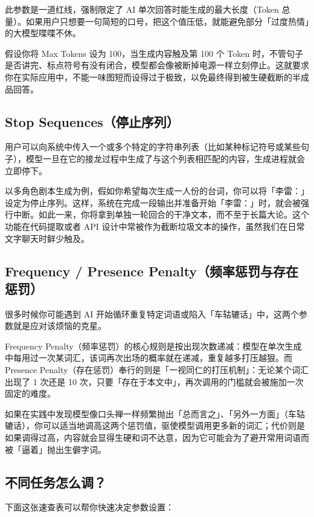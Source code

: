 此参数是一道红线，强制限定了 AI 单次回答时能生成的最大长度（Token 总量）。如果用户只想要一句简短的口号，把这个值压低，就能避免部分「过度热情」的大模型喋喋不休。

假设你将 Max Tokens 设为 100，当生成内容触及第 100 个 Token 时，不管句子是否讲完、标点符号有没有闭合，模型都会像被断掉电源一样立刻停止。这就要求你在实际应用中，不能一味图短而设得过于极致，以免最终得到被生硬截断的半成品回答。

\subsection*{Stop Sequences（停止序列）}

用户可以向系统中传入一个或多个特定的字符串列表（比如某种标记符号或某些句子），模型一旦在它的接龙过程中生成了与这个列表相匹配的内容，生成进程就会立即停下。

以多角色剧本生成为例，假如你希望每次生成一人份的台词，你可以将「李雷：」设定为停止序列。这样，系统在完成一段输出并准备开始「李雷：」时，就会被强行中断。如此一来，你将拿到单独一轮回合的干净文本，而不至于长篇大论。这个功能在代码提取或者 API 设计中常被作为截断垃圾文本的操作，虽然我们在日常文字聊天时鲜少触及。

\subsection*{Frequency / Presence Penalty（频率惩罚与存在惩罚）}

很多时候你可能遇到 AI 开始循环重复特定词语或陷入「车轱辘话」中，这两个参数就是应对该烦恼的克星。

Frequency Penalty（频率惩罚）的核心规则是按出现次数递减：模型在单次生成中每用过一次某词汇，该词再次出场的概率就在递减，重复越多打压越狠。而 Presence Penalty（存在惩罚）奉行的则是「一视同仁的打压机制」：无论某个词汇出现了 1 次还是 10 次，只要「存在于本文中」，再次调用的门槛就会被施加一次固定的难度。

如果在实践中发现模型像口头禅一样频繁抛出「总而言之」、「另外一方面」（车轱辘话），你可以适当地调高这两个惩罚值，驱使模型调用更多新的词汇；代价则是如果调得过高，内容就会显得生硬和词不达意，因为它可能会为了避开常用词语而被「逼着」抛出生僻字词。

\subsection*{不同任务怎么调？}

下面这张速查表可以帮你快速决定参数设置：

